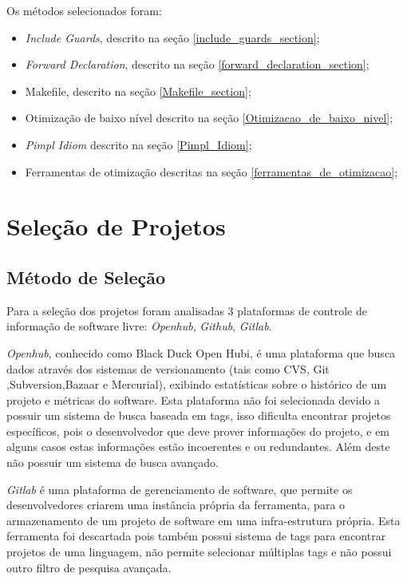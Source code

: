 Os métodos selecionados foram:

\begin{itemize}
	\item \textit{Include Guards}, descrito na seção
 \ref{include_guards_section};
	\item \textit{Forward Declaration}, descrito na seção
 \ref{forward_declaration_section};
	\item Makefile, descrito na seção
 \ref{Makefile_section};
	\item Otimização de baixo nível descrito na seção
 \ref{Otimizacao_de_baixo_nivel};
	\item \textit{Pimpl Idiom} descrito na seção
 \ref{Pimpl_Idiom};
	\item Ferramentas de otimização descritas na seção
 \ref{ferramentas_de_otimizacao};
\end{itemize}

\section{Seleção de Projetos}

\subsection{Método de Seleção}

Para a seleção dos projetos foram analisadas 3 plataformas de controle de informação
de software livre: \textit{Openhub}, \textit{Github}, \textit{Gitlab}.

\textit{Openhub}, conhecido como Black Duck Open Hubi, é uma plataforma que busca dados através
 dos sistemas de versionamento (tais como CVS, Git ,Subversion,Bazaar e Mercurial),
 exibindo estatísticas sobre o histórico de um projeto e métricas do software.
 Esta plataforma não foi selecionada devido a possuir um sistema de busca baseada em tags,
 isso dificulta encontrar projetos específicos, pois o desenvolvedor que deve prover
 informações do projeto, e em alguns casos estas informações estão incoerentes e ou
 redundantes. Além deste não possuir um sistema de busca avançado.

\textit{Gitlab} é uma plataforma de gerenciamento de software, que permite os
 desenvolvedores criarem uma instância própria da ferramenta, para o armazenamento
 de um projeto de software em uma infra-estrutura própria. Esta ferramenta foi
 descartada pois também possui sistema de tags para encontrar projetos de uma linguagem,
não permite selecionar múltiplas tags e não possui outro filtro de pesquisa avançada.

